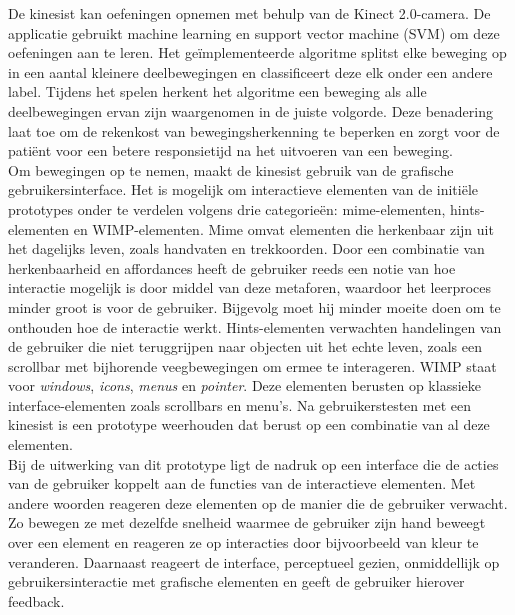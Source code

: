 De kinesist kan oefeningen opnemen met behulp van de Kinect 2.0-camera. De applicatie gebruikt machine learning en support vector machine (SVM) om deze oefeningen aan te leren. Het ge\"implementeerde algoritme splitst elke beweging op in een aantal kleinere deelbewegingen en classificeert deze elk onder een andere label. Tijdens het spelen herkent het algoritme een beweging als alle deelbewegingen ervan zijn waargenomen in de juiste volgorde. Deze benadering laat toe om de rekenkost van bewegingsherkenning te beperken en zorgt voor de pati\"ent voor een betere responsietijd na het uitvoeren van een beweging.\\

Om bewegingen op te nemen, maakt de kinesist gebruik van de grafische gebruikersinterface. Het is mogelijk om interactieve elementen van de initi\"ele prototypes onder te verdelen volgens drie categorie\"en: mime-elementen, hints-elementen en WIMP-elementen. Mime omvat elementen die herkenbaar zijn uit het dagelijks leven, zoals handvaten en trekkoorden. Door een combinatie van herkenbaarheid en affordances heeft de gebruiker reeds een notie van hoe interactie mogelijk is door middel van deze metaforen, waardoor het leerproces minder groot is voor de gebruiker. Bijgevolg moet hij minder moeite doen om te onthouden hoe de interactie werkt. Hints-elementen verwachten handelingen van de gebruiker die niet teruggrijpen naar objecten uit het echte leven, zoals een scrollbar met bijhorende veegbewegingen om ermee te interageren. WIMP staat voor \emph{windows}, \emph{icons}, \emph{menus} en \emph{pointer}. Deze elementen berusten op klassieke interface-elementen zoals scrollbars en menu's. Na gebruikerstesten met een kinesist is een prototype weerhouden dat berust op een combinatie van al deze elementen.\\

Bij de uitwerking van dit prototype ligt de nadruk op een interface die de acties van de gebruiker koppelt aan de functies van de interactieve elementen. Met andere woorden reageren deze elementen op de manier die de gebruiker verwacht. Zo bewegen ze met dezelfde snelheid waarmee de gebruiker zijn hand beweegt over een element en reageren ze op interacties door bijvoorbeeld van kleur te veranderen. Daarnaast reageert de interface, perceptueel gezien, onmiddellijk op gebruikersinteractie met grafische elementen en geeft de gebruiker hierover feedback.\\

